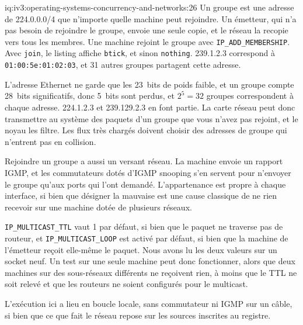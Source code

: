 \begin{solution}{iq:iv3:operating-systems-concurrency-and-networks:26}
Un groupe est une adresse de 224.0.0.0/4 que n'importe quelle machine peut rejoindre. Un émetteur, qui n'a pas besoin de rejoindre le groupe, envoie une seule copie, et le réseau la recopie vers tous les membres. Une machine rejoint le groupe avec \texttt{IP\_ADD\_MEMBERSHIP}. Avec \texttt{join}, le listing affiche \texttt{b\textquotesingle{}tick\textquotesingle{}}, et sinon \texttt{nothing}. 239.1.2.3 correspond à \texttt{01:00:5e:01:02:03}, et 31 autres groupes partagent cette adresse.
\label{lst:iv3:os:mcastmac}

L'adresse Ethernet ne garde que les 23~bits de poids faible, et un groupe compte 28~bits significatifs, donc 5~bits sont perdus, et $2^5 = 32$ groupes correspondent à chaque adresse. 224.1.2.3 et 239.129.2.3 en font partie. La carte réseau peut donc transmettre au système des paquets d'un groupe que vous n'avez pas rejoint, et le noyau les filtre. Les flux très chargés doivent choisir des adresses de groupe qui n'entrent pas en collision.

Rejoindre un groupe a aussi un versant réseau. La machine envoie un rapport IGMP, et les commutateurs dotés d'IGMP snooping s'en servent pour n'envoyer le groupe qu'aux ports qui l'ont demandé. L'appartenance est propre à chaque interface, si bien que désigner la mauvaise est une cause classique de ne rien recevoir sur une machine dotée de plusieurs réseaux.

\texttt{IP\_MULTICAST\_TTL} vaut 1 par défaut, si bien que le paquet ne traverse pas de routeur, et \texttt{IP\_MULTICAST\_LOOP} est activé par défaut, si bien que la machine de l'émetteur reçoit elle-même le paquet. Nous avons lu les deux valeurs sur un socket neuf. Un test sur une seule machine peut donc fonctionner, alors que deux machines sur des sous-réseaux différents ne reçoivent rien, à moins que le TTL ne soit relevé et que les routeurs ne soient configurés pour le multicast.

L'exécution ici a lieu en boucle locale, sans commutateur ni IGMP sur un câble, si bien que ce que fait le réseau repose sur les sources inscrites au registre.

\end{solution}

